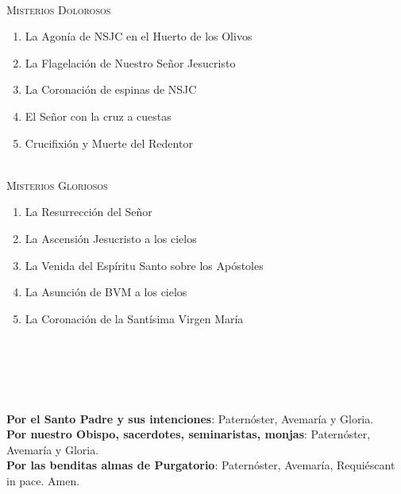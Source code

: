 \documentclass[9pt]{article}
\begin{document}
\begin{multicols*}{2}
    \small{}\\
    \textsc{Misterios Dolorosos}
    \begin{enumerate}
        \item La Agonía de NSJC en el Huerto de los Olivos
        \item La Flagelación de Nuestro Señor Jesucristo
        \item La Coronación de espinas de NSJC
        \item El Señor con la cruz a cuestas
        \item Crucifixión y Muerte del Redentor
    \end{enumerate}

    \vspace{2mm}

    \small{}\\
    \textsc{Misterios Gloriosos}
    \begin{enumerate}
        \item La Resurrección del Señor
        \item La Ascensión Jesucristo a los cielos
        \item La Venida del Espíritu Santo sobre los Apóstoles
        \item La Asunción de BVM a los cielos
        \item La Coronación de la Santísima Virgen María
    \end{enumerate}

    \vspace{2mm}

    \\[1mm]
    \\[1mm]
    \\[1mm]
    

    \vspace{2mm}

    \\

    \textbf{Por el Santo Padre y sus intenciones}: Paternóster, Avemaría y Gloria.\\[1mm]
    \textbf{Por nuestro Obispo, sacerdotes, seminaristas, monjas}: Paternóster, Avemaría y Gloria.\\[1mm]
    \textbf{Por las benditas almas de Purgatorio}: Paternóster, Avemaría, Requiéscant in pace. Amen.\\


\end{multicols*}
\end{document}
